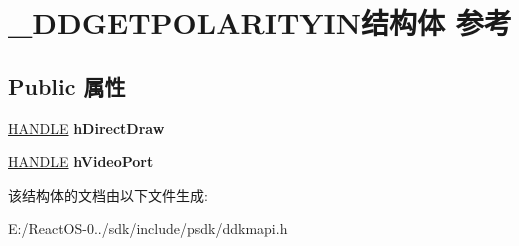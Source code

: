 \hypertarget{struct___d_d_g_e_t_p_o_l_a_r_i_t_y_i_n}{}\section{\+\_\+\+D\+D\+G\+E\+T\+P\+O\+L\+A\+R\+I\+T\+Y\+I\+N结构体 参考}
\label{struct___d_d_g_e_t_p_o_l_a_r_i_t_y_i_n}
\subsection*{Public 属性}
\begin{DoxyCompactItemize}
\item 
\mbox{\label{struct___d_d_g_e_t_p_o_l_a_r_i_t_y_i_n_aa8683abb51ea38ca9b158649c40de66a}} 
\hyperlink{interfacevoid}{H\+A\+N\+D\+LE} {\bfseries h\+Direct\+Draw}
\item 
\mbox{\label{struct___d_d_g_e_t_p_o_l_a_r_i_t_y_i_n_a329ef6e23a0fdaa3c13284c52b001f03}} 
\hyperlink{interfacevoid}{H\+A\+N\+D\+LE} {\bfseries h\+Video\+Port}
\end{DoxyCompactItemize}


该结构体的文档由以下文件生成\+:\begin{DoxyCompactItemize}
\item 
E\+:/\+React\+O\+S-\/0../sdk/include/psdk/ddkmapi.\+h\end{DoxyCompactItemize}
